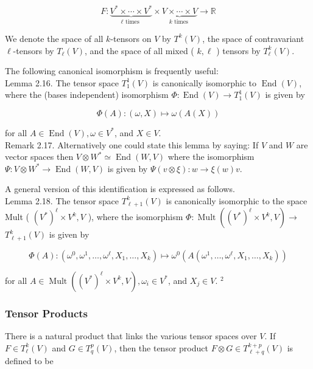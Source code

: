 \documentclass[10pt, letterpaper]{article}
\begin{document}
$$
F: \underbrace{V^{*} \times \cdots \times V^{*}}_{\ell \text { times }} \times \underbrace{V \times \cdots \times V}_{k \text { times }} \rightarrow \mathbb{R}
$$

We denote the space of all $k$-tensors on $V$ by $T^{k}(V)$, the space of contravariant $\ell$-tensors by $T_{\ell}(V)$, and the space of all mixed ( $k, \ell$ ) tensors by $T_{\ell}^{k}(V)$.

The following canonical isomorphism is frequently useful:\\
Lemma 2.16. The tensor space $T_{1}^{1}(V)$ is canonically isomorphic to $\operatorname{End}(V)$, where the (bases independent) isomorphism $\Phi: \operatorname{End}(V) \rightarrow T_{1}^{1}(V)$ is given by

$$
\Phi(A):(\omega, X) \mapsto \omega(A(X))
$$

for all $A \in \operatorname{End}(V), \omega \in V^{*}$, and $X \in V$.\\
Remark 2.17. Alternatively one could state this lemma by saying: If $V$ and $W$ are vector spaces then $V \otimes W^{*} \simeq \operatorname{End}(W, V)$ where the isomorphism $\Psi: V \otimes W^{*} \rightarrow \operatorname{End}(W, V)$ is given by $\Psi(v \otimes \xi): w \rightarrow \xi(w) v$.

A general version of this identification is expressed as follows.\\
Lemma 2.18. The tensor space $T_{\ell+1}^{k}(V)$ is canonically isomorphic to the space Mult ( $\left(V^{*}\right)^{\ell} \times V^{k}, V$ ), where the isomorphism $\Phi: \operatorname{Mult}\left(\left(V^{*}\right)^{\ell} \times V^{k}, V\right) \rightarrow$ $T_{\ell+1}^{k}(V)$ is given by

$$
\Phi(A):\left(\omega^{0}, \omega^{1}, \ldots, \omega^{\ell}, X_{1}, \ldots, X_{k}\right) \mapsto \omega^{0}\left(A\left(\omega^{1}, \ldots, \omega^{\ell}, X_{1}, \ldots, X_{k}\right)\right)
$$

for all $A \in \operatorname{Mult}\left(\left(V^{*}\right)^{\ell} \times V^{k}, V\right), \omega_{i} \in V^{*}$, and $X_{j} \in V$. ${ }^{2}$

\subsubsection*{Tensor Products}
There is a natural product that links the various tensor spaces over $V$. If $F \in T_{\ell}^{k}(V)$ and $G \in T_{q}^{p}(V)$, then the tensor product $F \otimes G \in T_{\ell+q}^{k+p}(V)$ is defined to be
\end{document}
